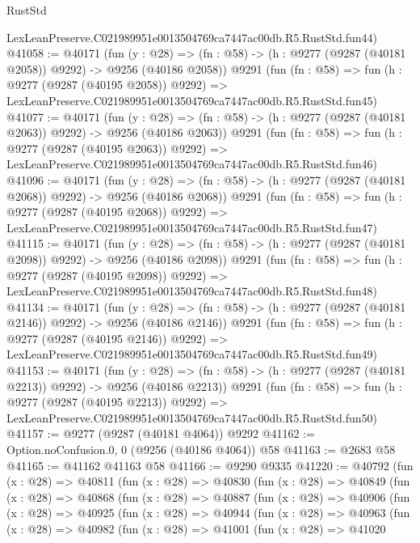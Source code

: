 \begin{lexlean}{RustStd}
\begin{coremodule}
    LexLeanPreserve.C021989951e0013504769ca7447ac00db.R5.RustStd.fun44)
@41058 := @40171
    (fun (y : @28) =>
    (fn : @58) -> (h : @9277 (@9287 (@40181 @2058)) @9292) -> @9256 (@40186 @2058))
    @9291
    (fun (fn : @58) =>
    fun (h : @9277 (@9287 (@40195 @2058)) @9292) =>
    LexLeanPreserve.C021989951e0013504769ca7447ac00db.R5.RustStd.fun45)
@41077 := @40171
    (fun (y : @28) =>
    (fn : @58) -> (h : @9277 (@9287 (@40181 @2063)) @9292) -> @9256 (@40186 @2063))
    @9291
    (fun (fn : @58) =>
    fun (h : @9277 (@9287 (@40195 @2063)) @9292) =>
    LexLeanPreserve.C021989951e0013504769ca7447ac00db.R5.RustStd.fun46)
@41096 := @40171
    (fun (y : @28) =>
    (fn : @58) -> (h : @9277 (@9287 (@40181 @2068)) @9292) -> @9256 (@40186 @2068))
    @9291
    (fun (fn : @58) =>
    fun (h : @9277 (@9287 (@40195 @2068)) @9292) =>
    LexLeanPreserve.C021989951e0013504769ca7447ac00db.R5.RustStd.fun47)
@41115 := @40171
    (fun (y : @28) =>
    (fn : @58) -> (h : @9277 (@9287 (@40181 @2098)) @9292) -> @9256 (@40186 @2098))
    @9291
    (fun (fn : @58) =>
    fun (h : @9277 (@9287 (@40195 @2098)) @9292) =>
    LexLeanPreserve.C021989951e0013504769ca7447ac00db.R5.RustStd.fun48)
@41134 := @40171
    (fun (y : @28) =>
    (fn : @58) -> (h : @9277 (@9287 (@40181 @2146)) @9292) -> @9256 (@40186 @2146))
    @9291
    (fun (fn : @58) =>
    fun (h : @9277 (@9287 (@40195 @2146)) @9292) =>
    LexLeanPreserve.C021989951e0013504769ca7447ac00db.R5.RustStd.fun49)
@41153 := @40171
    (fun (y : @28) =>
    (fn : @58) -> (h : @9277 (@9287 (@40181 @2213)) @9292) -> @9256 (@40186 @2213))
    @9291
    (fun (fn : @58) =>
    fun (h : @9277 (@9287 (@40195 @2213)) @9292) =>
    LexLeanPreserve.C021989951e0013504769ca7447ac00db.R5.RustStd.fun50)
@41157 := @9277 (@9287 (@40181 @4064)) @9292
@41162 := Option.noConfusion.{0, 0} (@9256 (@40186 @4064)) @58
@41163 := @2683 @58
@41165 := @41162 @41163 @58
@41166 := @9290 @9335
@41220 := @40792
    (fun (x : @28) =>
    @40811
      (fun (x : @28) =>
      @40830
        (fun (x : @28) =>
        @40849
          (fun (x : @28) =>
          @40868
            (fun (x : @28) =>
            @40887
              (fun (x : @28) =>
              @40906
                (fun (x : @28) =>
                @40925
                  (fun (x : @28) =>
                  @40944
                    (fun (x : @28) =>
                    @40963
                      (fun (x : @28) =>
                      @40982
                        (fun (x : @28) =>
                        @41001
                          (fun (x : @28) =>
                          @41020

\end{coremodule}
\end{lexlean}
